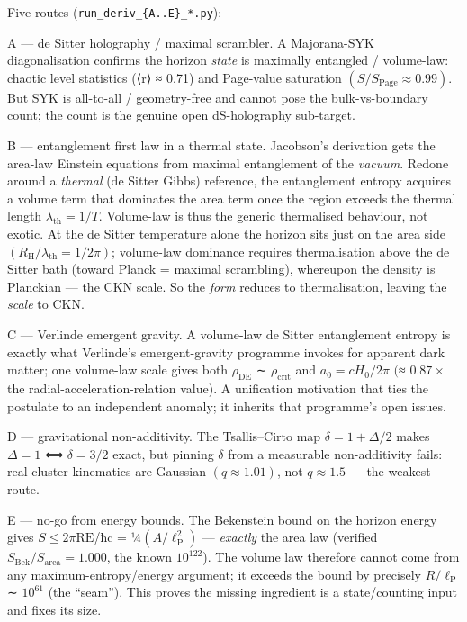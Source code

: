 \documentclass[aps,prd,preprint,nofootinbib,superscriptaddress]{revtex4-2}
\begin{document}
Five routes (\texttt{run\_deriv\_\{A..E\}\_*.py}):

A --- de Sitter holography / maximal scrambler. A Majorana-SYK
diagonalisation confirms the horizon \emph{state} is maximally entangled
/ volume-law: chaotic level statistics (⟨r⟩ ≈ 0.71) and Page-value
saturation \cite{Page:1993df} \((S/S_{\mathrm{Page}} \approx  0.99)\).
But SYK is all-to-all / geometry-free and cannot pose the
bulk-vs-boundary count; the count is the genuine open dS-holography
sub-target.

B --- entanglement first law in a thermal state. Jacobson's derivation
gets the area-law Einstein equations from maximal entanglement of the
\emph{vacuum}. Redone around a \emph{thermal} (de Sitter Gibbs)
reference, the entanglement entropy acquires a volume term that
dominates the area term once the region exceeds the thermal length
\(\lambda _{\mathrm{th}} = 1/T\). Volume-law is thus the generic
thermalised behaviour, not exotic. At the de Sitter temperature alone
the horizon sits just on the area side
\((R_{\mathrm{H}}/\lambda _{\mathrm{th}} = 1/2\pi )\); volume-law
dominance requires thermalisation above the de Sitter bath (toward
Planck = maximal scrambling), whereupon the density is Planckian --- the
CKN scale. So the \emph{form} reduces to thermalisation, leaving the
\emph{scale} to CKN.

C --- Verlinde emergent gravity. A volume-law de Sitter entanglement
entropy is exactly what Verlinde's emergent-gravity programme invokes
for apparent dark matter; one volume-law scale gives both
\(\rho _\mathrm{DE}\) ∼ \(\rho _{\mathrm{crit}}\) and
\(a_{0} = cH_{0}/2\pi\) \((\)≈ \(0.87\times\) the
radial-acceleration-relation value). A unification motivation that ties
the postulate to an independent anomaly; it inherits that programme's
open issues.

D --- gravitational non-additivity. The Tsallis--Cirto map
\(\delta  = 1 + \Delta /2\) makes \(\Delta =1\) ⟺ \(\delta =3/2\) exact,
but pinning \(\delta\) from a measurable non-additivity fails: real
cluster kinematics are Gaussian \((q \approx  1.01)\), not
\(q \approx  1.5\) --- the weakest route.

E --- no-go from energy bounds. The Bekenstein bound on the horizon
energy gives \(S \leq  2\pi \mathrm{RE}\)/ħc =
¼\((A/\ell _{\mathrm{P}}^{2})\) --- \emph{exactly} the area law
(verified \(S_{\mathrm{Bek}}/S_{\mathrm{area}} = 1.000\), the known
\(10^{122}\)). The volume law therefore cannot come from any
maximum-entropy/energy argument; it exceeds the bound by precisely
\(R/\ell _{\mathrm{P}}\) ∼ \(10^{61}\) (the ``seam''). This proves the
missing ingredient is a state/counting input and fixes its size.
\end{document}
